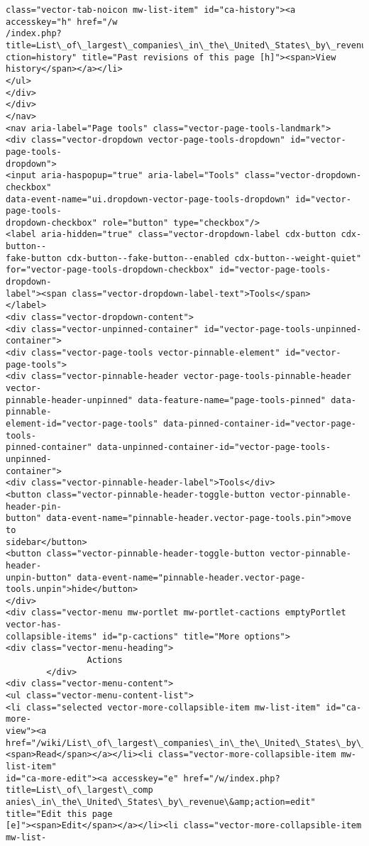 \documentclass[11pt]{article}
\begin{document}
\begin{Verbatim}[commandchars=\\\{\}]
class="vector-tab-noicon mw-list-item" id="ca-history"><a accesskey="h" href="/w
/index.php?title=List\_of\_largest\_companies\_in\_the\_United\_States\_by\_revenue\&amp;a
ction=history" title="Past revisions of this page [h]"><span>View
history</span></a></li>
</ul>
</div>
</div>
</nav>
<nav aria-label="Page tools" class="vector-page-tools-landmark">
<div class="vector-dropdown vector-page-tools-dropdown" id="vector-page-tools-
dropdown">
<input aria-haspopup="true" aria-label="Tools" class="vector-dropdown-checkbox"
data-event-name="ui.dropdown-vector-page-tools-dropdown" id="vector-page-tools-
dropdown-checkbox" role="button" type="checkbox"/>
<label aria-hidden="true" class="vector-dropdown-label cdx-button cdx-button--
fake-button cdx-button--fake-button--enabled cdx-button--weight-quiet"
for="vector-page-tools-dropdown-checkbox" id="vector-page-tools-dropdown-
label"><span class="vector-dropdown-label-text">Tools</span>
</label>
<div class="vector-dropdown-content">
<div class="vector-unpinned-container" id="vector-page-tools-unpinned-
container">
<div class="vector-page-tools vector-pinnable-element" id="vector-page-tools">
<div class="vector-pinnable-header vector-page-tools-pinnable-header vector-
pinnable-header-unpinned" data-feature-name="page-tools-pinned" data-pinnable-
element-id="vector-page-tools" data-pinned-container-id="vector-page-tools-
pinned-container" data-unpinned-container-id="vector-page-tools-unpinned-
container">
<div class="vector-pinnable-header-label">Tools</div>
<button class="vector-pinnable-header-toggle-button vector-pinnable-header-pin-
button" data-event-name="pinnable-header.vector-page-tools.pin">move to
sidebar</button>
<button class="vector-pinnable-header-toggle-button vector-pinnable-header-
unpin-button" data-event-name="pinnable-header.vector-page-
tools.unpin">hide</button>
</div>
<div class="vector-menu mw-portlet mw-portlet-cactions emptyPortlet vector-has-
collapsible-items" id="p-cactions" title="More options">
<div class="vector-menu-heading">
                Actions
        </div>
<div class="vector-menu-content">
<ul class="vector-menu-content-list">
<li class="selected vector-more-collapsible-item mw-list-item" id="ca-more-
view"><a href="/wiki/List\_of\_largest\_companies\_in\_the\_United\_States\_by\_revenue">
<span>Read</span></a></li><li class="vector-more-collapsible-item mw-list-item"
id="ca-more-edit"><a accesskey="e" href="/w/index.php?title=List\_of\_largest\_comp
anies\_in\_the\_United\_States\_by\_revenue\&amp;action=edit" title="Edit this page
[e]"><span>Edit</span></a></li><li class="vector-more-collapsible-item mw-list-

\end{Verbatim}
\end{document}
